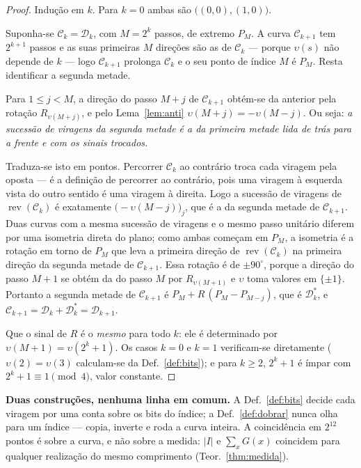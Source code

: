 \documentclass[11pt,a4paper]{article}
\newcommand{\abs}[1]{\lvert #1\rvert}
\begin{document}
\begin{proof}
Indução em $k$. Para $k=0$ ambas são $\bigl((0,0),(1,0)\bigr)$.

Suponha-se $\mathcal{C}_k=\mathcal{D}_k$, com $M=2^{k}$ passos, de extremo $P_M$. A curva $\mathcal{C}_{k+1}$
tem $2^{k+1}$ passos e as suas primeiras $M$ direções são as de $\mathcal{C}_k$ --- porque
$\upsilon(s)$ não depende de $k$ --- logo $\mathcal{C}_{k+1}$ prolonga $\mathcal{C}_k$ e o seu ponto de
índice $M$ é $P_M$. Resta identificar a segunda metade.

Para $1\le j<M$, a direção do passo $M+j$ de $\mathcal{C}_{k+1}$ obtém-se da anterior pela
rotação $R_{\upsilon(M+j)}$, e pelo Lema~\ref{lem:anti} $\upsilon(M+j)=-\upsilon(M-j)$. Ou
seja: \emph{a sucessão de viragens da segunda metade é a da primeira metade lida
de trás para a frente e com os sinais trocados.}

Traduza-se isto em pontos. Percorrer $\mathcal{C}_k$ ao contrário troca cada viragem pela
oposta --- é a definição de percorrer ao contrário, pois uma viragem à esquerda
vista do outro sentido é uma viragem à direita. Logo a sucessão de viragens de
$\operatorname{rev}(\mathcal{C}_k)$ é exatamente $\bigl(-\upsilon(M-j)\bigr)_j$, que é a da
segunda metade de $\mathcal{C}_{k+1}$. Duas curvas com a mesma sucessão de viragens e o
mesmo passo unitário diferem por uma isometria direta do plano; como ambas
começam em $P_M$, a isometria é a rotação em torno de $P_M$ que leva a primeira
direção de $\operatorname{rev}(\mathcal{C}_k)$ na primeira direção da segunda metade de
$\mathcal{C}_{k+1}$. Essa rotação é de $\pm90^{\circ}$, porque a direção do passo $M+1$ se
obtém da do passo $M$ por $R_{\upsilon(M+1)}$ e $\upsilon$ toma valores em
$\{\pm1\}$. Portanto a segunda metade de $\mathcal{C}_{k+1}$ é
$P_M+R\,(P_M-P_{M-j})$, que é $\mathcal{D}_k^{*}$, e $\mathcal{C}_{k+1}=\mathcal{D}_k+\mathcal{D}_k^{*}=\mathcal{D}_{k+1}$.

Que o sinal de $R$ é o \emph{mesmo} para todo $k$: ele é determinado por
$\upsilon(M+1)=\upsilon(2^{k}+1)$. Os casos $k=0$ e $k=1$ verificam-se
diretamente ($\upsilon(2)=\upsilon(3)$ calculam-se da Def.~\ref{def:bits}); e
para $k\ge2$, $2^{k}+1$ é ímpar com $2^{k}+1\equiv1\pmod4$, valor constante.
\end{proof}

\medskip\noindent\textbf{Duas construções, nenhuma linha em comum.} A
Def.~\ref{def:bits} decide cada viragem por uma conta sobre os bits do índice; a
Def.~\ref{def:dobrar} nunca olha para um índice --- copia, inverte e roda a curva
inteira. A coincidência em $2^{12}$ pontos é sobre a curva, e não sobre a
medida: $\abs{I}$ e $\sum_x G(x)$ coincidem para qualquer realização do mesmo
comprimento (Teor.~\ref{thm:medida}).
\end{document}
